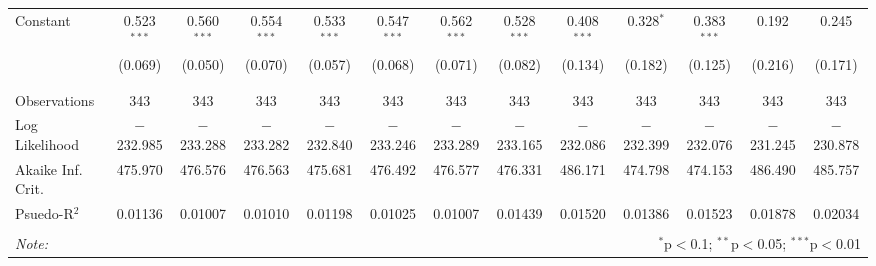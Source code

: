 \begin{subtables}
\begin{table}[H]
\begin{adjustbox}{width=\textwidth}
\begin{tabular}{@{\extracolsep{5pt}}lcccccccccccc}
 Constant & 0.523$^{***}$ & 0.560$^{***}$ & 0.554$^{***}$ & 0.533$^{***}$ & 0.547$^{***}$ & 0.562$^{***}$ & 0.528$^{***}$ & 0.408$^{***}$ & 0.328$^{*}$ & 0.383$^{***}$ & 0.192 & 0.245 \\ 
  & (0.069) & (0.050) & (0.070) & (0.057) & (0.068) & (0.071) & (0.082) & (0.134) & (0.182) & (0.125) & (0.216) & (0.171) \\ 
  & & & & & & & & & & & & \\ 
\hline \\[-1.8ex] 
Observations & 343 & 343 & 343 & 343 & 343 & 343 & 343 & 343 & 343 & 343 & 343 & 343 \\ 
Log Likelihood & $-$232.985 & $-$233.288 & $-$233.282 & $-$232.840 & $-$233.246 & $-$233.289 & $-$233.165 & $-$232.086 & $-$232.399 & $-$232.076 & $-$231.245 & $-$230.878 \\ 
Akaike Inf. Crit. & 475.970 & 476.576 & 476.563 & 475.681 & 476.492 & 476.577 & 476.331 & 486.171 & 474.798 & 474.153 & 486.490 & 485.757 \\ 
  Psuedo-R$^{2}$ & 0.01136 & 0.01007 & 0.01010 & 0.01198 & 0.01025 & 0.01007 & 0.01439 & 0.01520 & 0.01386 & 0.01523 & 0.01878 & 0.02034 \\
\hline 
\hline \\[-1.8ex] 
\textit{Note:}  & \multicolumn{12}{r}{$^{*}$p$<$0.1; $^{**}$p$<$0.05; $^{***}$p$<$0.01} \\ 
\end{tabular} 
\end{adjustbox}
\end{table} 
\end{subtables}
  
  
  
 

\newpage


